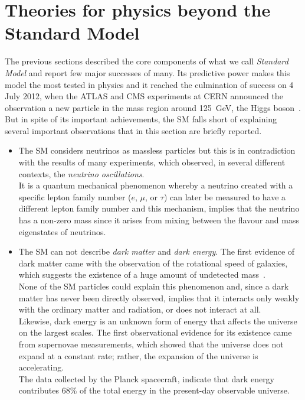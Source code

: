 \newpage
\section{Theories for physics beyond the Standard Model}
\label{sec:bsm}
The previous sections described the core components of what we call \textit{Standard Model} and report few major successes of many. 
Its predictive power makes this model the most tested in physics and it reached the culmination of success on 4 July 2012, when
the ATLAS and CMS experiments at CERN announced the observation a new particle in the mass region around 125~GeV, the
Higgs boson~\cite{higgsDiscovery}. \\
But in spite of its important achievements, the SM falls short of explaining several important observations that in this section
are briefly reported.
\begin{itemize}
\item The SM considers neutrinos as massless particles but this is in contradiction with the results of many experiments, which observed,
in several different contexts, the \textit{neutrino oscillations}. \\
It is a quantum mechanical phenomenon whereby a neutrino created with a specific lepton family number ($e$, $\mu$, or $\tau$) 
can later be measured to have a different lepton family number and this mechanism, implies that the neutrino has a non-zero mass 
since it arises from mixing between the flavour and mass eigenstates of neutrinos. 
\item The SM can not describe \textit{dark matter} and \textit{dark energy}. The first evidence of dark matter came with the observation of 
the rotational speed of galaxies, which suggests the existence of a huge amount of undetected mass~\cite{zwicky}.\\
None of the SM particles could explain this phenomenon and, since a dark matter has never been directly observed, implies that
it interacts only weakly with the ordinary matter and radiation, or does not interact at all.\\
Likewise, dark energy is an unknown form of energy that affects the universe on the largest scales.
The first observational evidence for its existence came from supernovae measurements, which showed that the universe does 
not expand at a constant rate; rather, the expansion of the universe is accelerating.\\
The data collected by the Planck spacecraft, indicate that dark energy contributes  68\% of the total energy in the present-day observable universe. 

\end{itemize}
